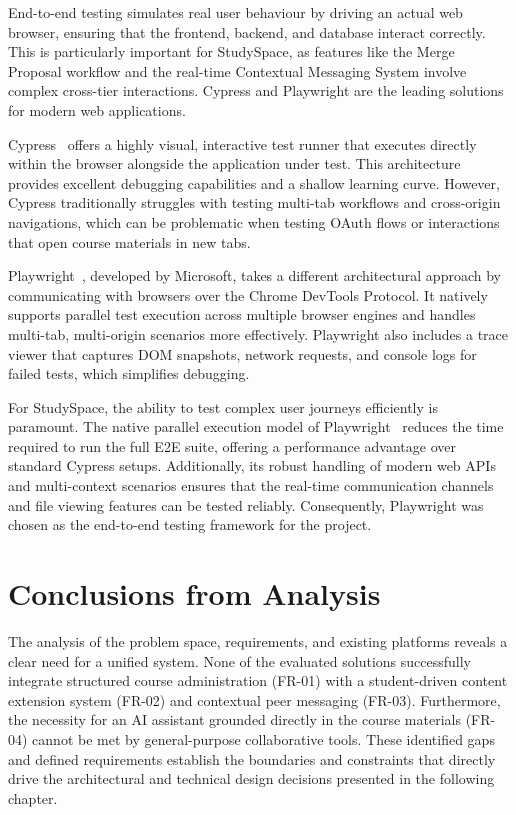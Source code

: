 End-to-end testing simulates real user behaviour by driving an actual web browser, ensuring that the frontend, backend, and database interact correctly. This is particularly important for StudySpace, as features like the Merge Proposal workflow and the real-time Contextual Messaging System involve complex cross-tier interactions. Cypress and Playwright are the leading solutions for modern web applications.

Cypress~\cite{Cypress} offers a highly visual, interactive test runner that executes directly within the browser alongside the application under test. This architecture provides excellent debugging capabilities and a shallow learning curve. However, Cypress traditionally struggles with testing multi-tab workflows and cross-origin navigations, which can be problematic when testing OAuth flows or interactions that open course materials in new tabs.

Playwright~\cite{Playwright}, developed by Microsoft, takes a different architectural approach by communicating with browsers over the Chrome DevTools Protocol. It natively supports parallel test execution across multiple browser engines and handles multi-tab, multi-origin scenarios more effectively. Playwright also includes a trace viewer that captures DOM snapshots, network requests, and console logs for failed tests, which simplifies debugging.

For StudySpace, the ability to test complex user journeys efficiently is paramount. The native parallel execution model of Playwright~\cite{PlaywrightParallelism} reduces the time required to run the full E2E suite, offering a performance advantage over standard Cypress setups. Additionally, its robust handling of modern web APIs and multi-context scenarios ensures that the real-time communication channels and file viewing features can be tested reliably. Consequently, Playwright was chosen as the end-to-end testing framework for the project.

\section{Conclusions from Analysis}
\label{sec:conclusions-from-analysis}

The analysis of the problem space, requirements, and existing platforms reveals a clear need for a unified system. None of the evaluated solutions successfully integrate structured course administration (FR-01) with a student-driven content extension system (FR-02) and contextual peer messaging (FR-03). Furthermore, the necessity for an AI assistant grounded directly in the course materials (FR-04) cannot be met by general-purpose collaborative tools. These identified gaps and defined requirements establish the boundaries and constraints that directly drive the architectural and technical design decisions presented in the following chapter.